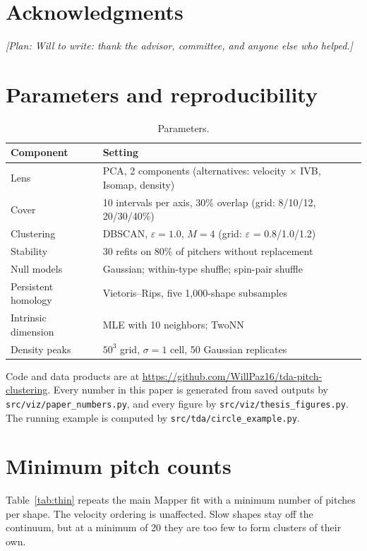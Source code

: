 \documentclass{article}
\newif\ifshowplan \showplantrue
\newcommand{\plan}[1]{\ifshowplan\par\emph{[Plan: #1]}\par\fi}
\theoremstyle{definition}
\theoremstyle{remark}
\begin{document}
\section{Acknowledgments}
\plan{Will to write: thank the advisor, committee, and anyone else who helped.}

\appendix
\section{Parameters and reproducibility}\label{app:repro}
\begin{table}[htbp]
\centering
\begin{tabular}{ll}
\toprule
Component & Setting \\
\midrule
Lens & PCA, 2 components (alternatives: velocity $\times$ IVB, Isomap, density) \\
Cover & 10 intervals per axis, 30\% overlap (grid: 8/10/12, 20/30/40\%) \\
Clustering & DBSCAN, $\varepsilon = 1.0$, $M = 4$ (grid: $\varepsilon$ = 0.8/1.0/1.2) \\
Stability & 30 refits on 80\% of pitchers without replacement \\
Null models & Gaussian; within-type shuffle; spin-pair shuffle \\
Persistent homology & Vietoris--Rips, five 1{,}000-shape subsamples \\
Intrinsic dimension & MLE with 10 neighbors; TwoNN \\
Density peaks & $50^3$ grid, $\sigma = 1$ cell, 50 Gaussian replicates \\
\bottomrule
\end{tabular}
\caption{Parameters.}
\end{table}
Code and data products are at \url{https://github.com/WillPaz16/tda-pitch-clustering}. Every number in this paper is generated from saved outputs by \texttt{src/viz/paper\_numbers.py}, and every figure by \texttt{src/viz/thesis\_figures.py}. The running example is computed by \texttt{src/tda/circle\_example.py}.

\section{Minimum pitch counts}\label{app:thin}
Table~\ref{tab:thin} repeats the main Mapper fit with a minimum number of pitches per shape.
The velocity ordering is unaffected. Slow shapes stay off the continuum, but at a minimum of 20 they are too few to form clusters of their own.
\end{document}
